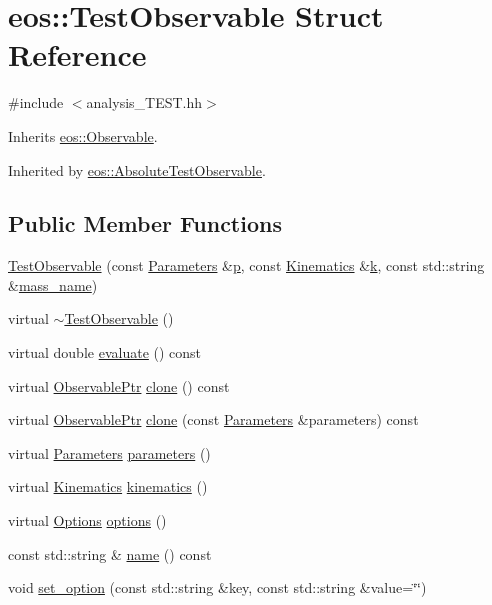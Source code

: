 \hypertarget{structeos_1_1TestObservable}{
\section{eos::TestObservable Struct Reference}
\label{structeos_1_1TestObservable}
}


{\ttfamily \#include $<$analysis\_\-TEST.hh$>$}

Inherits \hyperlink{classeos_1_1Observable}{eos::Observable}.

Inherited by \hyperlink{structeos_1_1AbsoluteTestObservable}{eos::AbsoluteTestObservable}.\subsection*{Public Member Functions}
\begin{DoxyCompactItemize}
\item 
\hyperlink{structeos_1_1TestObservable_af44302acc1d97376ea453c133cf08c02}{TestObservable} (const \hyperlink{classeos_1_1Parameters}{Parameters} \&\hyperlink{structeos_1_1TestObservable_ab06f6f24a04051ec2a8ebaa5d78ee953}{p}, const \hyperlink{classeos_1_1Kinematics}{Kinematics} \&\hyperlink{structeos_1_1TestObservable_a58ef1eee27197c2bce21b2e576411a74}{k}, const std::string \&\hyperlink{structeos_1_1TestObservable_afa242c890fb7299876f30e8d01e218fc}{mass\_\-name})
\item 
virtual \hyperlink{structeos_1_1TestObservable_a1462125ba005e855c9127da2ce8c7f15}{$\sim$TestObservable} ()
\item 
virtual double \hyperlink{structeos_1_1TestObservable_a05f143463bc9a2cddec1ee2bdb8d5ba2}{evaluate} () const 
\item 
virtual \hyperlink{namespaceeos_a470e5dd806bd129080f1aa0c2954646f}{ObservablePtr} \hyperlink{structeos_1_1TestObservable_a2ec70cb32b39215b3c3eafd05a94e1f6}{clone} () const 
\item 
virtual \hyperlink{namespaceeos_a470e5dd806bd129080f1aa0c2954646f}{ObservablePtr} \hyperlink{structeos_1_1TestObservable_a40b0831f486d5a73e583becb0c6c9da4}{clone} (const \hyperlink{classeos_1_1Parameters}{Parameters} \&parameters) const 
\item 
virtual \hyperlink{classeos_1_1Parameters}{Parameters} \hyperlink{structeos_1_1TestObservable_ab6aef566fbe0f34117da1d484e20da40}{parameters} ()
\item 
virtual \hyperlink{classeos_1_1Kinematics}{Kinematics} \hyperlink{structeos_1_1TestObservable_a87b7da05ef887b71fee092252a70a685}{kinematics} ()
\item 
virtual \hyperlink{classeos_1_1Options}{Options} \hyperlink{structeos_1_1TestObservable_a6d762181ac0ce1d2d8ad9d377a3a565d}{options} ()
\item 
const std::string \& \hyperlink{structeos_1_1TestObservable_a1cc59da836d9dab76351b7afcbdb73f1}{name} () const 
\item 
void \hyperlink{structeos_1_1TestObservable_ae4be408b4c96b6d86a080c966170b96b}{set\_\-option} (const std::string \&key, const std::string \&value=\char`\"{}\char`\"{})
\end{DoxyCompactItemize}
